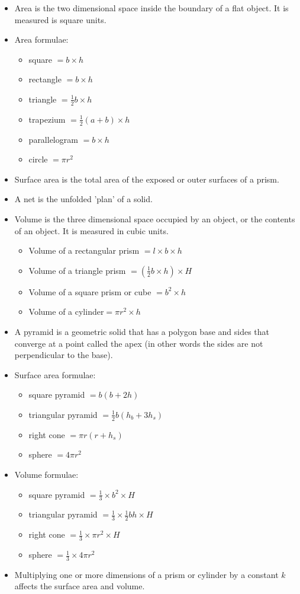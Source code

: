 \begin{itemize}
 \item Area is the two dimensional space inside the boundary of a flat object. It is measured
is square units.
\item Area formulae:
\begin{itemize}
\item square $= b \times h$
\item rectangle $= b \times h$
\item triangle $= \frac{1}{2} b \times h$
\item trapezium $= \frac{1}{2} (a+b) \times h$
\item parallelogram $= b \times h$
\item circle $= \pi r^2$
\end{itemize}
\item Surface area is the total area of the exposed or outer surfaces of a prism.
\item A net is the unfolded 'plan' of a solid.
\item Volume is the three dimensional space occupied by an object, or the contents of an
object. It is measured in cubic units.
\begin{itemize}
\item Volume of a rectangular prism $=l \times b \times h$
\item Volume of a triangle prism $= (\frac{1}{2} b \times h) \times H$
\item Volume of a square prism or cube $=b^2 \times h$
\item Volume of a cylinder$=\pi r^2 \times h$
\end{itemize}
\item A pyramid is a geometric solid that has a polygon base and sides that converge at a
point called the apex (in other words the sides are not perpendicular to the base).
\item Surface area formulae:
\begin{itemize}
\item square pyramid $=b(b+2h)$
\item triangular pyramid $= \frac{1}{2}b(h_b +3h_s)$
\item right cone $= \pi r(r+h_s)$
\item sphere $= 4\pi r^2$
\end{itemize}
\item Volume formulae:
\begin{itemize}[noitemsep]
\item square pyramid $=\frac{1}{3} \times b^2 \times H$
\item triangular pyramid $= \frac{1}{3} \times \frac{1}{2}bh \times H$
\item right cone $= \frac{1}{3} \times \pi r^2 \times H$
\item sphere $= \frac{1}{3} \times 4\pi r^2$
\end{itemize}
\item Multiplying one or more dimensions of a prism or cylinder by a constant $k$ affects the surface area and volume.


\end{itemize}
